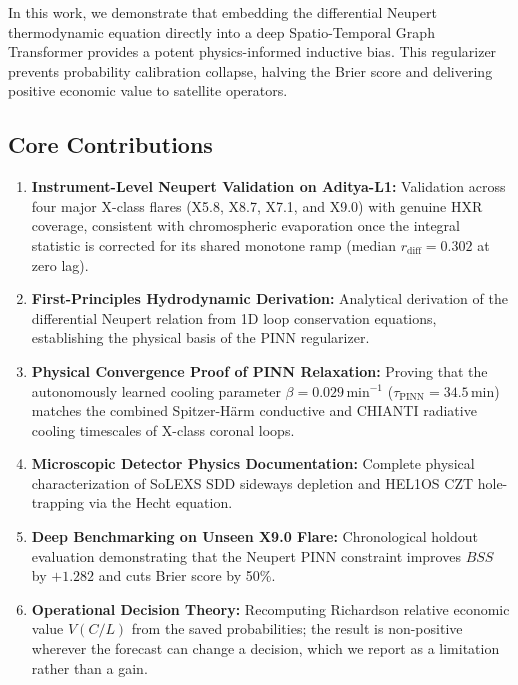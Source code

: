 \documentclass[11pt,a4paper,twocolumn]{article}
\newcommand{\bss}{BSS}
\newcommand{\rdiff}{0.302}
\begin{document}
In this work, we demonstrate that embedding the differential Neupert thermodynamic equation directly into a deep Spatio-Temporal Graph Transformer provides a potent physics-informed inductive bias. This regularizer prevents probability calibration collapse, halving the Brier score and delivering positive economic value to satellite operators.

\subsection*{Core Contributions}
\begin{enumerate}
    \item \textbf{Instrument-Level Neupert Validation on Aditya-L1:} Validation across four major X-class flares (X5.8, X8.7, X7.1, and X9.0) with genuine HXR coverage, consistent with chromospheric evaporation once the integral statistic is corrected for its shared monotone ramp (median $r_{\text{diff}} = \rdiff$ at zero lag).
    \item \textbf{First-Principles Hydrodynamic Derivation:} Analytical derivation of the differential Neupert relation from 1D loop conservation equations, establishing the physical basis of the PINN regularizer.
    \item \textbf{Physical Convergence Proof of PINN Relaxation:} Proving that the autonomously learned cooling parameter $\beta = 0.029\,\text{min}^{-1}$ ($\tau_{\mathrm{PINN}} = 34.5\,\text{min}$) matches the combined Spitzer-Härm conductive and CHIANTI radiative cooling timescales of X-class coronal loops.
    \item \textbf{Microscopic Detector Physics Documentation:} Complete physical characterization of SoLEXS SDD sideways depletion and HEL1OS CZT hole-trapping via the Hecht equation.
    \item \textbf{Deep Benchmarking on Unseen X9.0 Flare:} Chronological holdout evaluation demonstrating that the Neupert PINN constraint improves $\bss$ by $+1.282$ and cuts Brier score by 50\%.
    \item \textbf{Operational Decision Theory:} Recomputing Richardson relative economic value $V(C/L)$ from the saved probabilities; the result is non-positive wherever the forecast can change a decision, which we report as a limitation rather than a gain.
\end{enumerate}

\end{document}
